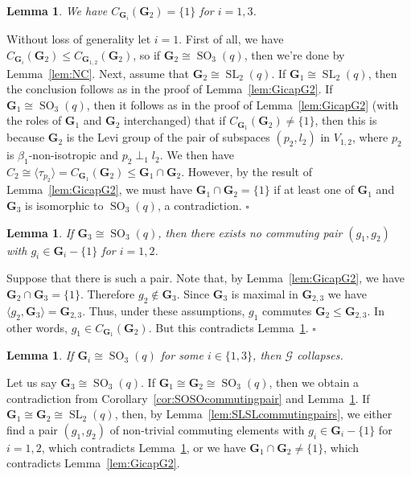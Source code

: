 \documentclass[12pt]{amsart}
\newtheorem{lemma}[theorem]{Lemma}
\theoremstyle{definition}
\newcommand{\bpf}{\noindent{\bf Proof}\hspace{7pt}}
\newcommand{\epf}{\qed}
\newcommand{\ble}{\begin{lemma}}
\newcommand{\ele}{\end{lemma}}
\DeclareMathOperator{\SL}{SL}
\DeclareMathOperator{\SO}{SO}
\renewcommand{\qed}{\hfill $\square$}
\newcommand{\amgrpG}{{\mathbf{G}}}
\newcommand{\amG}{{\mathscr{G}}}
\begin{document}
\ble\label{lem:CGiG2=1}
We have $C_{\amgrpG_i}(\amgrpG_2)=\{1\}$ for $i=1,3$.
\ele
\bpf
Without loss of generality let $i=1$.
First of all, we have $C_{\amgrpG_i}(\amgrpG_2)\le C_{\amgrpG_{1,2}}(\amgrpG_2)$, so if $\amgrpG_2\cong\SO_3(q)$, then we're done by Lemma~\ref{lem:NC}.
Next, assume that $\amgrpG_2\cong\SL_2(q)$.
If $\amgrpG_1\cong\SL_2(q)$, then the conclusion follows as in the proof of Lemma~\ref{lem:GicapG2}.
If $\amgrpG_1\cong\SO_3(q)$, then it follows as in the proof of Lemma~\ref{lem:GicapG2} (with the roles of $\amgrpG_1$ and $\amgrpG_2$ interchanged) that 
 if $C_{\amgrpG_1}(\amgrpG_2)\ne \{1\}$, then this is because $\amgrpG_2$ is the Levi group of the pair of subspaces $(p_2,l_2)$ in $V_{1,2}$, where $p_2$ is $\beta_1$-non-isotropic and $p_2\perp_1 l_2$. 
 We then have $C_2\cong \langle \tau_{p_2} \rangle=C_{\amgrpG_1}(\amgrpG_2)\le \amgrpG_1\cap\amgrpG_2$. 
However, by the result of Lemma~\ref{lem:GicapG2}, we must have $\amgrpG_1\cap\amgrpG_2=\{1\}$ if at least one of $\amgrpG_1$ and $\amgrpG_3$ is isomorphic to $\SO_3(q)$, a contradiction.
\epf

\ble\label{lem:G3=SO3}
If $\amgrpG_3\cong\SO_3(q)$, then there exists no commuting pair $(g_1,g_2)$ with $g_i\in \amgrpG_i-\{1\}$ for $i=1,2$.
\ele
\bpf
Suppose that there is such a pair.
Note that, by Lemma~\ref{lem:GicapG2}, we have 
 $\amgrpG_2\cap\amgrpG_3=\{1\}$. Therefore $g_2\not\in \amgrpG_3$.
Since $\amgrpG_3$ is maximal in $\amgrpG_{2,3}$ we have 
$\langle g_2,\amgrpG_3\rangle=\amgrpG_{2,3}$.
Thus, under these assumptions, $g_1$ commutes  $\amgrpG_2\le \amgrpG_{2,3}$. In other words, 
 $g_1\in C_{\amgrpG_1}(\amgrpG_2)$. But this contradicts Lemma~\ref{lem:CGiG2=1}.
%
\epf
\ble
If $\amgrpG_i\cong \SO_3(q)$ for some $i\in \{1,3\}$, then $\amG$ collapses.
\ele
\bpf
Let us say $\amgrpG_3\cong\SO_3(q)$. 
If $\amgrpG_1\cong \amgrpG_2\cong \SO_3(q)$, then we obtain a contradiction from Corollary~\ref{cor:SOSOcommutingpair} and Lemma~\ref{lem:G3=SO3}.
If $\amgrpG_1\cong\amgrpG_2\cong\SL_2(q)$, then, by Lemma~\ref{lem:SLSLcommutingpairs}, we either find a pair $(g_1,g_2)$ of non-trivial commuting elements with $g_i\in \amgrpG_i-\{1\}$ for $i=1,2$, which contradicts Lemma~\ref{lem:G3=SO3}, or we have $\amgrpG_1\cap\amgrpG_2\ne\{1\}$, which contradicts Lemma~\ref{lem:GicapG2}.
\end{document}
